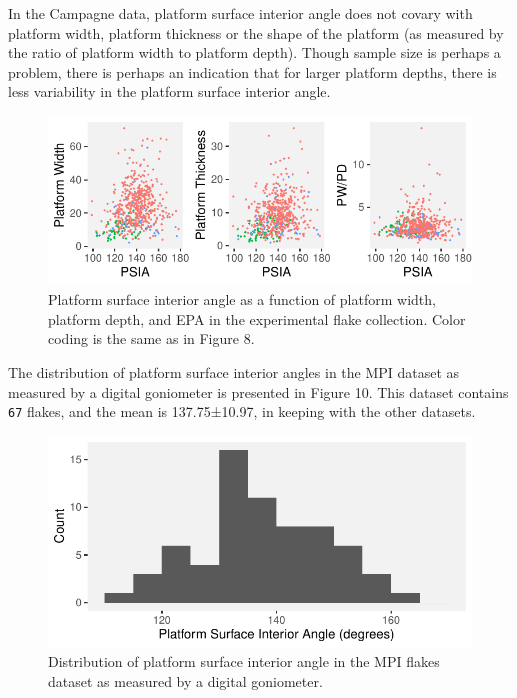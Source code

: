 \documentclass[10pt,letterpaper]{article}
\begin{document}
In the Campagne data, platform surface interior angle does not covary
with platform width, platform thickness or the shape of the platform (as
measured by the ratio of platform width to platform depth). Though
sample size is perhaps a problem, there is perhaps an indication that
for larger platform depths, there is less variability in the platform
surface interior angle.

\begin{figure}
\centering
\includegraphics{PSIA_Manuscript_files/figure-latex/fig9-PSIA_to_other_measaures-1.pdf}
\caption{Platform surface interior angle as a function of platform
width, platform depth, and EPA in the experimental flake collection.
Color coding is the same as in Figure 8.}
\end{figure}

The distribution of platform surface interior angles in the MPI dataset
as measured by a digital goniometer is presented in Figure 10. This
dataset contains \texttt{67} flakes, and the mean is 137.75±10.97, in
keeping with the other datasets.

\begin{figure}
\centering
\includegraphics{PSIA_Manuscript_files/figure-latex/fig10-mpi_data-1.pdf}
\caption{Distribution of platform surface interior angle in the MPI
flakes dataset as measured by a digital goniometer.}
\end{figure}
\end{document}
